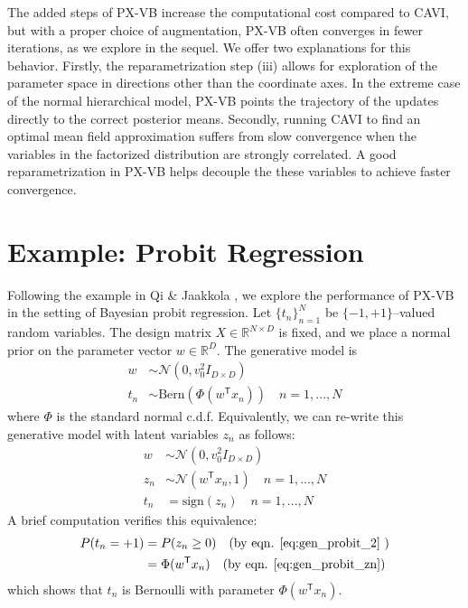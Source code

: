 \documentclass{article}
\begin{document}
The added steps of PX-VB increase the computational cost compared to CAVI, but with a proper choice of augmentation,  PX-VB often converges in fewer iterations, as we explore in the sequel. We offer two explanations for this behavior. Firstly, the reparametrization step (iii) allows for exploration of the parameter space in directions other than the coordinate axes. In the extreme case of the normal hierarchical model, PX-VB points the trajectory of the updates directly to the correct posterior means. Secondly, running CAVI to find an optimal mean field approximation suffers from slow convergence when the variables in the factorized distribution are strongly correlated. A good reparametrization in PX-VB helps decouple the these variables to achieve faster convergence. 




\section{Example: Probit Regression}
\label{probit}

Following the example in Qi \& Jaakkola \cite{Qi}, we explore the performance of PX-VB in the setting of Bayesian probit regression. Let $\{t_n\}_{n=1}^N$ be $\{-1,+1\}$--valued random variables. The design matrix $X\in\mathbb R^{N\times D}$ is fixed, and we place a normal prior on the parameter vector $w\in\mathbb R^D$. The generative model is
\begin{align}
w &\sim \mathcal N (0, v_0^2I_{D\times D}) \\
t_n &\sim \text{Bern}(\Phi(w^\mathsf T x_n))\quad n = 1, ..., N \label{eq:gen_probit_1}
\end{align}
where $\Phi$ is the standard normal c.d.f. Equivalently, we can re-write this generative model with latent variables $z_n$ as follows: 
\begin{align}
    w &\sim \mathcal N (0, v_0^2I_{D\times D}) \\
    z_n &\sim \mathcal N (w^\mathsf T x_n, 1)\quad n = 1, ..., N \label{eq:gen_probit_zn}\\
    t_n &= \text{sign}(z_n) \quad n = 1, ..., N \label{eq:gen_probit_2}
\end{align}
A brief computation verifies this equivalence: 
\begin{align}
P(t_n = +1) &= P(z_n \geq 0) \quad \text{(by eqn. \ref{eq:gen_probit_2} )}\\
&= \Phi(w^\mathsf Tx_n) \quad \text{(by eqn. \ref{eq:gen_probit_zn})}
\end{align}
which shows that $t_n$ is Bernoulli with parameter $\Phi(w^\mathsf Tx_n)$. 
\end{document}
